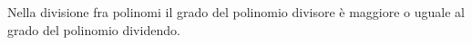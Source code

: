 Nella divisione fra polinomi il grado del polinomio divisore 
è maggiore o uguale al grado del polinomio dividendo. %
